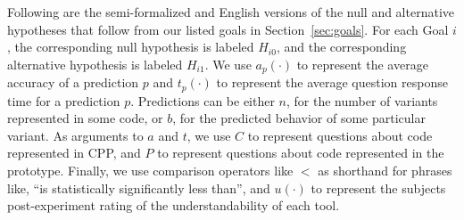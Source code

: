 \documentclass[11pt]{article}
\begin{document}
	Following are the semi-formalized and English versions of the null and
	alternative hypotheses that follow from our listed goals in
	Section~\ref{sec:goals}.  For each Goal $i$, the corresponding null hypothesis
	is labeled $H_{i0}$, and the corresponding alternative hypothesis is labeled
	$H_{i1}$.  We use $a_p(\cdot)$ to represent the average accuracy of a
	prediction $p$ and $t_p(\cdot)$ to represent the average question response time
	for a prediction $p$.  Predictions can be either $n$, for the number of
	variants represented in some code, or $b$, for the predicted behavior of some
	particular variant.  As arguments to $a$ and $t$, we use $C$ to represent
	questions about code represented in CPP, and $P$ to represent questions about
	code represented in the prototype.  Finally, we use comparison operators like
	$<$ as shorthand for phrases like, ``is statistically significantly less
	than'', and $u(\cdot)$ to represent the subjects post-experiment rating of the
	understandability of each tool.
	
\end{document}
